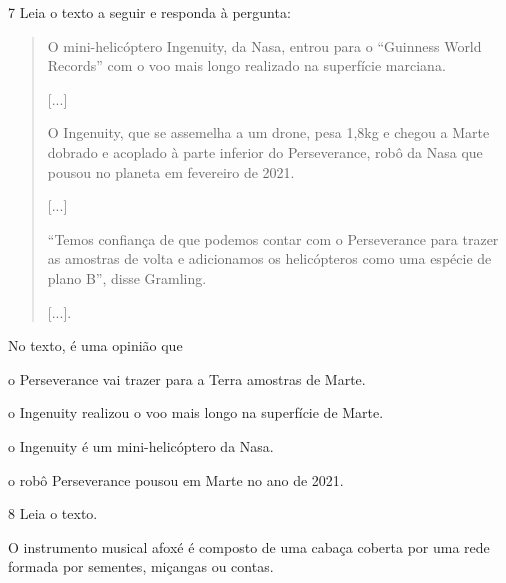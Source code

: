 \num{7} Leia o texto a seguir e responda à pergunta:

\begin{quote}
O mini-helicóptero Ingenuity, da Nasa, entrou para o “Guinness World
Records” com o voo mais longo realizado na superfície marciana.

{[}...{]}

O Ingenuity, que se assemelha a um drone, pesa 1,8kg e chegou a Marte
dobrado e acoplado à parte inferior do Perseverance, robô da Nasa que
pousou no planeta em fevereiro de 2021.

{[}...{]}

“Temos confiança de que podemos contar com o Perseverance para trazer
as amostras de volta e adicionamos os helicópteros como uma espécie de
plano B”, disse Gramling.

{[}...{]}.

\end{quote}

No texto, é uma opinião que

\begin{escolha}
\item o Perseverance vai trazer para a Terra amostras de Marte.

\item o Ingenuity realizou o voo mais longo na superfície de Marte.

\item o Ingenuity é um mini-helicóptero da Nasa.

\item o robô Perseverance pousou em Marte no ano de 2021.
\end{escolha}


\num{8}  Leia o texto.

O instrumento musical afoxé é composto de uma cabaça coberta por uma
rede formada por sementes, miçangas ou contas.

